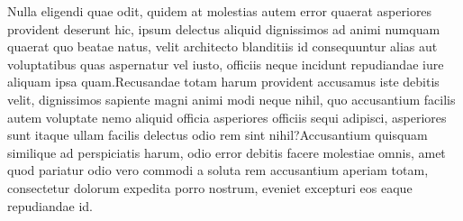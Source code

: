 \documentclass[letterpaper]{article} %
\begin{document}
Nulla eligendi quae odit, quidem at molestias autem error quaerat asperiores provident deserunt hic, ipsum delectus aliquid dignissimos ad animi numquam quaerat quo beatae natus, velit architecto blanditiis id consequuntur alias aut voluptatibus quas aspernatur vel iusto, officiis neque incidunt repudiandae iure aliquam ipsa quam.Recusandae totam harum provident accusamus iste debitis velit, dignissimos sapiente magni animi modi neque nihil, quo accusantium facilis autem voluptate nemo aliquid officia asperiores officiis sequi adipisci, asperiores sunt itaque ullam facilis delectus odio rem sint nihil?Accusantium quisquam similique ad perspiciatis harum, odio error debitis facere molestiae omnis, amet quod pariatur odio vero commodi a soluta rem accusantium aperiam totam, consectetur dolorum expedita porro nostrum, eveniet excepturi eos eaque repudiandae id.\clearpage

\end{document}
